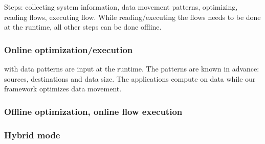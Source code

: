 \documentclass[letter]{article}
\begin{document}
Steps: collecting system information, data movement patterns, optimizing, reading flows, executing flow. While reading/executing the flows needs to be done at the runtime, all other steps can be done offline.

\subsubsection{Online optimization/execution} with data patterns are input at the runtime. The patterns are known in advance: sources, destinations and data size. The applications compute on data while our framework optimizes data movement.



\subsubsection{Offline optimization, online flow execution}

\subsubsection{Hybrid mode}
\end{document}
